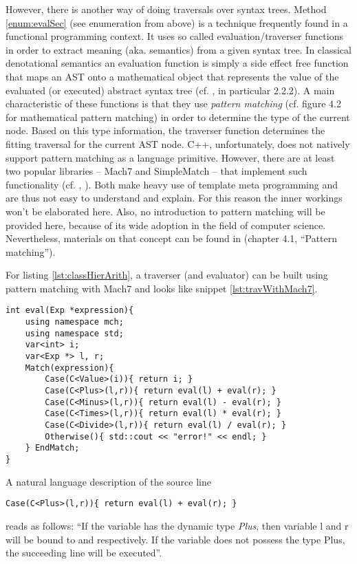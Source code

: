 However, there is another way of doing traversals over syntax
trees. Method \ref{enum:evalSec} (see enumeration from above) is a
technique
frequently found in a functional programming context. It uses so
called evaluation/traverser functions in order to extract meaning
(aka. semantics) from a given syntax tree. In classical denotational
semantics
an evaluation function is simply a side effect free function that maps
an AST onto a
mathematical object that represents the value of the evaluated (or
executed) abstract syntax tree (cf. \cite{SCH97}, in particular
2.2.2). A main characteristic of these
functions is that they use \emph{pattern matching} (cf. \cite{SCH97}
figure 4.2 for mathematical pattern matching)
in order to determine the type of the current node. Based on this type
information, the traverser function determines the fitting traversal
for the current AST node. C++, unfortunately, does not natively support
pattern matching as a language primitive. However, there are at least
two popular libraries -- Mach7 and SimpleMatch -- that implement such
functionality (cf. \cite{MACH7}, \cite{SIMPLEMATCH}). Both make
heavy use of template meta programming and are thus not easy to
understand and explain. For this reason the inner workings won't be
elaborated here. Also, no introduction to pattern matching will be
provided here, because of its wide adoption in the field of computer
science. Nevertheless, materials on that concept can be found in
\cite{LYAH} (chapter 4.1, ``Pattern matching'').

For listing \ref{lst:classHierArith}, a traverser (and
evaluator) can be built using
pattern matching with Mach7 and looks like snippet \ref{lst:travWithMach7}.
%
\begin{lstlisting}[style=c++,caption={Traverser with Mach7 pattern
      matching},label={lst:travWithMach7}]
int eval(Exp *expression){
    using namespace mch;
    using namespace std;
    var<int> i;
    var<Exp *> l, r;
    Match(expression){
        Case(C<Value>(i)){ return i; }
        Case(C<Plus>(l,r)){ return eval(l) + eval(r); }
        Case(C<Minus>(l,r)){ return eval(l) - eval(r); }
        Case(C<Times>(l,r)){ return eval(l) * eval(r); }
        Case(C<Divide>(l,r)){ return eval(l) / eval(r); }
        Otherwise(){ std::cout << "error!" << endl; }
    } EndMatch;
}
\end{lstlisting}
%
A natural language description of the source line
\begin{lstlisting}[style=c++]
    Case(C<Plus>(l,r)){ return eval(l) + eval(r); }
\end{lstlisting}
reads as follows: ``If the variable  has the dynamic type
\emph{Plus}, then variable l and r will be bound to
 
and  respectively. If the
variable does not possess the type Plus, the succeeding line will be executed''.

